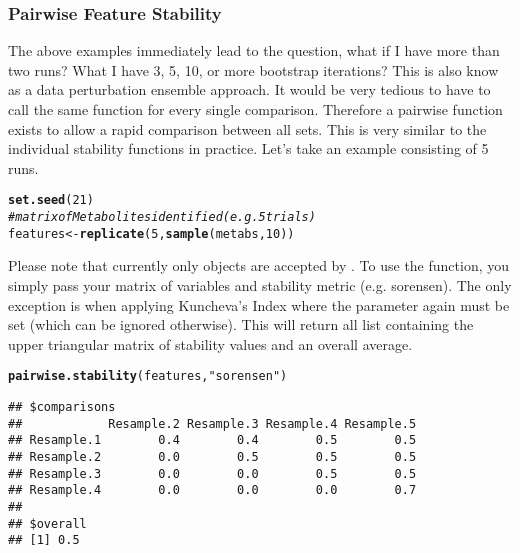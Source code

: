 \documentclass[12pt]{article}\usepackage[]{graphicx}\usepackage[usenames,dvipsnames]{color}
\makeatletter
\newcommand{\hlnum}[1]{\textcolor[rgb]{0.686,0.059,0.569}{#1}}%
\newcommand{\hlstr}[1]{\textcolor[rgb]{0.192,0.494,0.8}{#1}}%
\newcommand{\hlcom}[1]{\textcolor[rgb]{0.678,0.584,0.686}{\textit{#1}}}%
\newcommand{\hlstd}[1]{\textcolor[rgb]{0.345,0.345,0.345}{#1}}%
\newcommand{\hlkwb}[1]{\textcolor[rgb]{0.69,0.353,0.396}{#1}}%
\newcommand{\hlkwd}[1]{\textcolor[rgb]{0.737,0.353,0.396}{\textbf{#1}}}%
\newenvironment{kframe}{%
 \def\at@end@of@kframe{}%
 \ifinner\ifhmode%
  \def\at@end@of@kframe{\end{minipage}}%
  \begin{minipage}{\columnwidth}%
 \fi\fi%
 \def\FrameCommand##1{\hskip\@totalleftmargin \hskip-\fboxsep
 \colorbox{shadecolor}{##1}\hskip-\fboxsep
     \hskip-\linewidth \hskip-\@totalleftmargin \hskip\columnwidth}%
 \MakeFramed {\advance\hsize-\width
   \@totalleftmargin\z@ \linewidth\hsize
   \@setminipage}}%
 {\par\unskip\endMakeFramed%
 \at@end@of@kframe}
\newenvironment{knitrout}{}{} %
\makeatother
\begin{document}
\subsubsection{Pairwise Feature Stability}

The above examples immediately lead to the question, what if I have more than
two runs?  What I have 3, 5, 10, or more bootstrap iterations?  This is also
know as a data perturbation ensemble approach.  It would be  very tedious to 
have to call the same function for every single comparison.  Therefore a 
pairwise function exists to allow a rapid comparison between all sets.  
This  is very similar to the individual 
stability functions in practice.  Let's take an example consisting of 5 runs.

\begin{knitrout}
\color{fgcolor}\begin{kframe}
\begin{alltt}
\hlkwd{set.seed}\hlstd{(}\hlnum{21}\hlstd{)}
\hlcom{# matrix of Metabolites identified (e.g. 5 trials)}
\hlstd{features} \hlkwb{<-} \hlkwd{replicate}\hlstd{(}\hlnum{5}\hlstd{,} \hlkwd{sample}\hlstd{(metabs,} \hlnum{10}\hlstd{))}
\end{alltt}
\end{kframe}
\end{knitrout}

Please note that currently only  objects are accepted by
.  To use the function, you simply pass your 
matrix of variables and stability metric (e.g. sorensen).  The only exception
is when applying Kuncheva's Index where the  parameter again must
be set (which can be ignored otherwise).  This will return all list containing 
the upper triangular matrix of stability values and an overall average.

\begin{knitrout}
\color{fgcolor}\begin{kframe}
\begin{alltt}
\hlkwd{pairwise.stability}\hlstd{(features,} \hlstr{"sorensen"}\hlstd{)}
\end{alltt}
\begin{verbatim}
## $comparisons
##            Resample.2 Resample.3 Resample.4 Resample.5
## Resample.1        0.4        0.4        0.5        0.5
## Resample.2        0.0        0.5        0.5        0.5
## Resample.3        0.0        0.0        0.5        0.5
## Resample.4        0.0        0.0        0.0        0.7
## 
## $overall
## [1] 0.5
\end{verbatim}
\end{kframe}
\end{knitrout}
\end{document}
